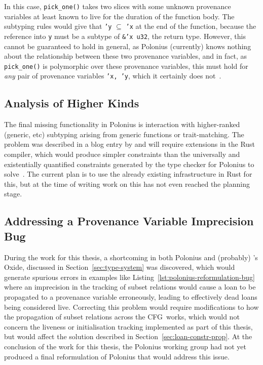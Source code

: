 \documentclass[11pt,a4paper,twoside,openany]{report}
\newcommand{\InRust}[1]{\texttt{#1}}
\begin{document}
{In this case, \InRust{pick_one()} takes two slices with some unknown provenance
variables at least known to live for the duration of the function body. The
subtyping rules would give that \InRust{'y} $\subseteq$ \InRust{'x} at the end
of the function, because the reference into \InRust{y} must be a subtype of
\InRust{&'x u32}, the return type. However, this cannot be guaranteed to hold in
general, as Polonius (currently) knows nothing about the relationship between
these two provenance variables, and in fact, as \InRust{pick_one()} is
polymorphic over these provenance variables, this must hold for \emph{any} pair
of provenance variables \InRust{'x, 'y}, which it certainly does
not~\cite{matsakis_polonius_2019-1}.

\subsection{Analysis of Higher Kinds}
\label{sec:missing-features:higher-kinds}

The final missing functionality in Polonius is interaction with higher-ranked
(generic, etc) subtyping arising from generic functions or trait-matching. The
problem was described in a blog entry by \citeauthor*{matsakis_polonius_2019} and
will require extensions in the Rust compiler, which would produce simpler
constraints than the universally and existentially quantified constraints
generated by the type checker for Polonius to
solve~\cite{matsakis_polonius_2019}. The current plan is to use the already
existing infrastructure in Rust for this, but at the time of writing work on
this has not even reached the planning stage.

\subsection{Addressing a Provenance Variable Imprecision Bug}
\label{sec:missing-features:provenance-variable-equality}

During the work for this thesis, a shortcoming in both Polonius and (probably)
\citeauthor*{weiss_oxide:_2019}'s Oxide, discussed in
Section~\ref{sec:type-system} was discovered, which would generate spurious
errors in examples like Listing~\ref{lst:polonius-reformulation-bug} where an
imprecision in the tracking of subset relations would cause a loan to be
propagated to a provenance variable erroneously, leading to effectively dead
loans being considered live. Correcting this problem would require modifications
to how the propagation of subset relations across the CFG~works, which would not
concern the liveness or initialisation tracking implemented as part of this
thesis, but would affect the solution described in
Section~\ref{sec:loan-constr-prop}. At the conclusion of the work for this
thesis, the Polonius working group had not yet produced a final reformulation of
Polonius that would address this issue.

}
\end{document}
